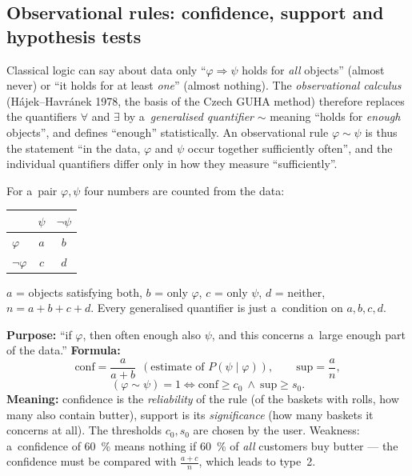 \documentclass[11pt,a4paper]{article}
\theoremstyle{definition}
\providecommand{\uv}[1]{``#1''}
\begin{document}
\subsection{Observational rules: confidence, support and hypothesis tests}
\label{ssec:observacni}

Classical logic can say about data only \uv{$\varphi\Rightarrow\psi$ holds for
\emph{all} objects} (almost never) or \uv{it holds for at least \emph{one}} (almost
nothing). The \emph{observational calculus} (Hájek--Havránek 1978, the basis of the
Czech GUHA method) therefore replaces the quantifiers $\forall$ and $\exists$ by
a~\emph{generalised quantifier} $\sim$ meaning \uv{holds for \emph{enough} objects},
and defines \uv{enough} statistically. An observational rule $\varphi\sim\psi$ is thus
the statement \uv{in the data, $\varphi$ and $\psi$ occur together sufficiently often},
and the individual quantifiers differ only in how they measure \uv{sufficiently}.

\begin{defbox}
For a~pair $\varphi,\psi$ four numbers are counted from the data:
\begin{center}
\begin{tabular}{@{}lcc@{}}
\toprule
 & $\psi$ & $\neg\psi$ \\
\midrule
$\varphi$ & $a$ & $b$ \\
$\neg\varphi$ & $c$ & $d$ \\
\bottomrule
\end{tabular}
\end{center}
$a$ = objects satisfying both, $b$ = only $\varphi$, $c$ = only $\psi$, $d$ = neither,
$n=a+b+c+d$. Every generalised quantifier is just a~condition on $a,b,c,d$.
\end{defbox}

\begin{defbox}
\textbf{Purpose:} \uv{if $\varphi$, then often enough also $\psi$, and this concerns
a~large enough part of the data.} \textbf{Formula:}
\[ \mathrm{conf}=\frac{a}{a+b}\ \ (\text{estimate of } P(\psi\mid\varphi)),\qquad
   \mathrm{sup}=\frac{a}{n}, \]
\[ (\varphi\sim\psi)=1 \iff \mathrm{conf}\ge c_0\ \wedge\ \mathrm{sup}\ge s_0 . \]
\textbf{Meaning:} confidence is the \emph{reliability} of the rule (of the baskets with
rolls, how many also contain butter), support is its \emph{significance} (how many
baskets it concerns at all). The thresholds $c_0, s_0$ are chosen by the user. Weakness:
a~confidence of 60~\% means nothing if 60~\% of \emph{all} customers buy butter --- the
confidence must be compared with $\tfrac{a+c}{n}$, which leads to type~2.
\end{defbox}
\end{document}
